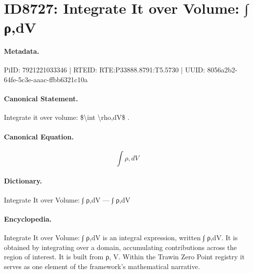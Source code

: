 \section*{ID8727: Integrate It over Volume: ∫ ρ,dV}
\paragraph{Metadata.}
PiID: 7921221033346 | RTEID: RTE:P33888.8791:T5.5730 | UUID: 8056a2b2-64fe-5c3e-aaac-ffbb6321c10a

\paragraph{Canonical Statement.}
Integrate it over volume: \$\textbackslash{}int \textbackslash{}rho,dV\$ .

\paragraph{Canonical Equation.}
\[
\int \rho,dV
\]

\paragraph{Dictionary.}
Integrate It over Volume: ∫ ρ,dV — ∫ ρ,dV

\paragraph{Encyclopedia.}
Integrate It over Volume: ∫ ρ,dV is an integral expression, written ∫ ρ,dV. It is obtained by integrating over a domain, accumulating contributions across the region of interest. It is built from ρ, V. Within the Trawin Zero Point registry it serves as one element of the framework's mathematical narrative.
